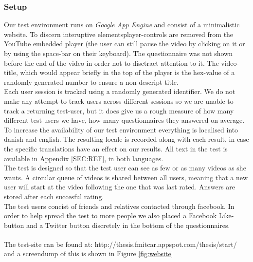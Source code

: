 \subsubsection{Setup}
%
Our test environment runs on \textit{Google App Engine} and consist of a minimalistic website. To discern interuptive elementsplayer-controls are removed from the YouTube embedded player (the user can still pause the video by clicking on it or by using the space-bar on their keyboard). The questionnaire was not shown before the end of the video in order not to disctract attention to it. The video-title, which would appear briefly in the top of the player is the hex-value of a randomly generated number to ensure a non-descript title.\\
Each user session is tracked using a randomly generated identifier. We do not make any attempt to track users across different sessions so we are unable to track a returning test-user, but it does give us a rough measure of how many different test-users we have, how many questionnaires they answered on average.\\
To increase the availability of our test environment everything is localised into danish and english. The resulting locale is recorded along with each result, in case the specific translations have an effect on our results. All text in the test is available in Appendix [SEC:REF], in both languages.\\
The test is designed so that the test user can see as few or as many videos as she wants. A circular queue of videos is shared between all users, meaning that a new user will start at the video following the one that was last rated. Answers are stored after each succesful rating.\\
The test users concist of friends and relatives contacted through facebook. In order to help spread the test to more people we also placed a Facebook Like-button and a Twitter button discretely in the bottom of the questionnaires.\\\\
%
The test-site can be found at: http://thesis.fmitcar.appspot.com/thesis/start/ and a screendump of this is shown in Figure \ref{fig:website}
%
